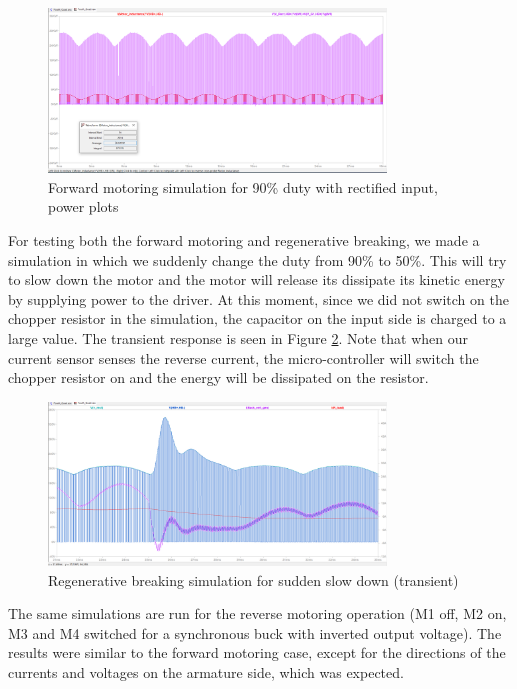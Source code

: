 \begin{figure}[H]
    \centering
    \includegraphics[width=0.8\textwidth]{Figures/Spice_Figures/Motoring_Full_Duty_Rectified_Losses_MOSFET10W_Sim.PNG}
    \caption{Forward motoring simulation for 90\% duty with rectified input, power plots}
    \label{fig:LTspice_forward_90_duty_rectified_power}
\end{figure}

For testing both the forward motoring and regenerative breaking, we made a simulation in which we suddenly change the duty from 90\% to 50\%. This will try to slow down the motor and the motor will release its dissipate its kinetic energy by supplying power to the driver. At this moment, since we did not switch on the chopper resistor in the simulation, the capacitor on the input side is charged to a large value. The transient response is seen in Figure \ref{fig:LTspice_regenerative_breaking}. Note that when our current sensor senses the reverse current, the micro-controller will switch the chopper resistor on and the energy will be dissipated on the resistor.

\begin{figure}[H]
    \centering
    \includegraphics[width=0.8\textwidth]{Figures/Spice_Figures/Motoring_Full_Duty_to_Half_Regenerative_Sim.PNG}
    \caption{Regenerative breaking simulation for sudden slow down (transient)}    
    \label{fig:LTspice_regenerative_breaking}
\end{figure}

The same simulations are run for the reverse motoring operation (M1 off, M2 on, M3 and M4 switched for a synchronous buck with inverted output voltage). The results were similar to the forward motoring case, except for the directions of the currents and voltages on the armature side, which was expected. \\

